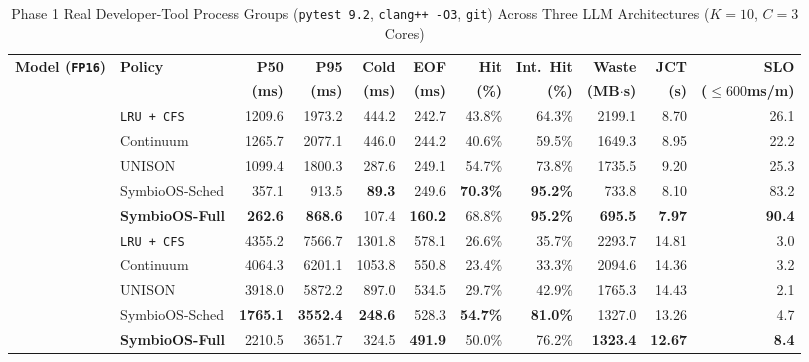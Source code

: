 \documentclass[10pt,journal,compsoc]{IEEEtran}
\theoremstyle{definition}
\theoremstyle{remark}
\newcommand{\SymbioSched}{\textup{\textsc{SymbioOS-Sched}}}
\newcommand{\SymbioFull}{\textup{\textsc{SymbioOS-Full}}}
\newcommand{\Continuum}{\textup{\textsc{Continuum}}}
\newcommand{\UNISON}{\textup{\textsc{UNISON}}}
\def\SymbioSched{SymbioOS-Sched}%
\def\SymbioFull{SymbioOS-Full}%
\def\Continuum{Continuum}%
\def\UNISON{UNISON}%
\begin{document}
\begin{table}[!t]
\centering
\caption{Phase 1 Real Developer-Tool Process Groups (\texttt{pytest 9.2}, \texttt{clang++ -O3}, \texttt{git}) Across Three LLM Architectures ($K{=}10$, $C{=}3$ Cores)}
\label{tab:phase1}
\scriptsize
\setlength{\tabcolsep}{2.2pt}
\begin{tabular}{llrrrrrrrrr}
\toprule
\textbf{Model (\texttt{FP16})} & \textbf{Policy} & \textbf{P50} & \textbf{P95} & \textbf{Cold} & \textbf{EOF} & \textbf{Hit} & \textbf{Int.\ Hit} & \textbf{Waste} & \textbf{JCT} & \textbf{SLO} \\
 & & \textbf{(ms)} & \textbf{(ms)} & \textbf{(ms)} & \textbf{(ms)} & \textbf{(\%)} & \textbf{(\%)} & \textbf{(MB$\cdot$s)} & \textbf{(s)} & \textbf{($\le 600$ms/m)} \\
\midrule
{}
 & \texttt{LRU + CFS} & 1209.6 & 1973.2 & 444.2 & 242.7 & 43.8\% & 64.3\% & 2199.1 & 8.70 & 26.1 \\
 & \Continuum{} & 1265.7 & 2077.1 & 446.0 & 244.2 & 40.6\% & 59.5\% & 1649.3 & 8.95 & 22.2 \\
 & \UNISON{} & 1099.4 & 1800.3 & 287.6 & 249.1 & 54.7\% & 73.8\% & 1735.5 & 9.20 & 25.3 \\
 & \SymbioSched{} & 357.1 & 913.5 & \textbf{89.3} & 249.6 & \textbf{70.3\%} & \textbf{95.2\%} & 733.8 & 8.10 & 83.2 \\
 & \textbf{\SymbioFull{}} & \textbf{262.6} & \textbf{868.6} & 107.4 & \textbf{160.2} & 68.8\% & \textbf{95.2\%} & \textbf{695.5} & \textbf{7.97} & \textbf{90.4} \\
\midrule
{}
 & \texttt{LRU + CFS} & 4355.2 & 7566.7 & 1301.8 & 578.1 & 26.6\% & 35.7\% & 2293.7 & 14.81 & 3.0 \\
 & \Continuum{} & 4064.3 & 6201.1 & 1053.8 & 550.8 & 23.4\% & 33.3\% & 2094.6 & 14.36 & 3.2 \\
 & \UNISON{} & 3918.0 & 5872.2 & 897.0 & 534.5 & 29.7\% & 42.9\% & 1765.3 & 14.43 & 2.1 \\
 & \SymbioSched{} & \textbf{1765.1} & \textbf{3552.4} & \textbf{248.6} & 528.3 & \textbf{54.7\%} & \textbf{81.0\%} & 1327.0 & 13.26 & 4.7 \\
 & \textbf{\SymbioFull{}} & 2210.5 & 3651.7 & 324.5 & \textbf{491.9} & 50.0\% & 76.2\% & \textbf{1323.4} & \textbf{12.67} & \textbf{8.4} \\

\end{tabular}
\end{table}
\end{document}
